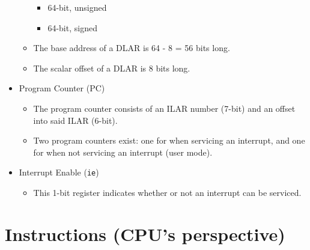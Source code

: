 \documentclass{article}
\begin{document}
\begin{itemize}
\begin{itemize}
\begin{itemize}
			\item 64-bit, unsigned
			\item 64-bit, signed
			\end{itemize}
		\item The base address of a DLAR is 64 - 8 = 56 bits long.
		\item The scalar offset of a DLAR is 8 bits long.
		\end{itemize}
	\item Program Counter (PC)
		\begin{itemize}
		\item The program counter consists of an ILAR number (7-bit) and an
			offset into said ILAR (6-bit).
		\item Two program counters exist:  one for when servicing an
			interrupt, and one for when not servicing an interrupt (user
			mode).
		\end{itemize}
	\item Interrupt Enable (\texttt{ie})
		\begin{itemize}
		\item This 1-bit register indicates whether or not an interrupt can
			be serviced.
		\end{itemize}
	\end{itemize}

\section{Instructions (CPU's perspective)}
\end{document}
